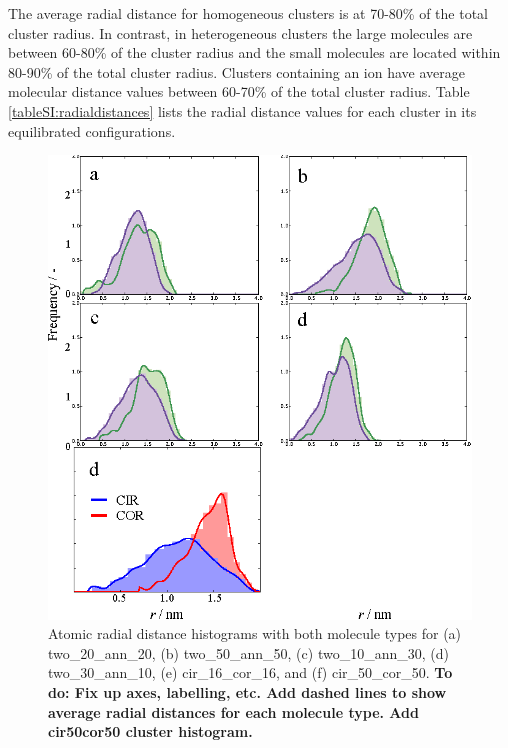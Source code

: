 The average radial distance for homogeneous clusters is at 70-80\% of the total cluster radius. In contrast, in heterogeneous clusters the large molecules are between 60-80\% of the cluster radius and the small molecules are located within 80-90\% of the total cluster radius.  Clusters containing an ion have average molecular distance values between 60-70\% of the total cluster radius. %
Table \ref{tableSI:radialdistances} lists the radial distance values for each cluster in its equilibrated configurations.

%
\begin{figure}[!tbh]
\centering
\includegraphics[width=0.8\linewidth]{Figures/radii_histograms_aa.eps}
\caption{Atomic radial distance histograms with both molecule types for (a) two\_20\_ann\_20, (b) two\_50\_ann\_50, (c) two\_10\_ann\_30, (d) two\_30\_ann\_10, (e) cir\_16\_cor\_16, and (f) cir\_50\_cor\_50. \textbf{To do: Fix up axes, labelling, etc. Add dashed lines to show average radial distances for each molecule type. Add cir50cor50 cluster histogram.}}
\label{fig:radialdists_atomic}
\end{figure}
%


